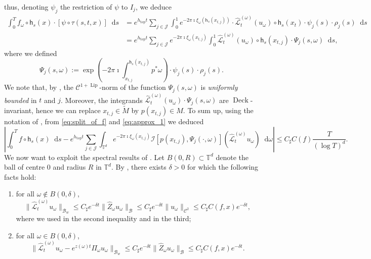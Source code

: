 \documentclass[11pt,letterpaper]{amsart}
\newcommand \cL {{\mathcal L}}
\newcommand \T {{ \mathbb T}}
\newcommand \tM {{\widetilde M}}
\newcommand \cB {{\mathscr B}}
\newcommand \sC {{C_\sharp}}
\newcommand{\horo}{\mathsf{h}}
\newcommand*{\diff}{\mathop{}\!\mathrm{d}}
\DeclareMathOperator{\topp}{top}
\DeclareMathOperator{\Deck}{Deck}
\DeclareMathOperator{\Lip}{Lip}
\theoremstyle{definition}
\begin{document}
thus, denoting $\psi_j$ the restriction of $\psi$ to $I_j$, we deduce
%
\[
\begin{split}
\int_0^T f_\omega \circ \horo_s(x) \cdot [\psi \circ \tau(s,t,x) ] \diff s &= e^{h_{\topp}t} \sum_{j \in \mathcal{J}} \int_{0}^{1} e^{- 2 \pi \imath \xi_{\omega}(\horo_s(x_{t,j}))} \cdot \hat{\cL}^{(\omega)}_{t} (u_{\omega}) \circ \horo_s(x_{t}) \cdot \psi_j(s) \cdot \rho_j(s) \diff s \\
 &= e^{h_{\topp}t} \sum_{j \in \mathcal{J}} e^{- 2 \pi \imath \xi_{\omega}(x_{t,j})}\int_{0}^{1} \hat{\cL}^{(\omega)}_{t} (u_{\omega}) \circ \horo_s(x_{t,j}) \cdot \Psi_j(s,\omega) \diff s,
\end{split}
\]
where we defined
\begin{equation}\label{eq:def_of_Psi}
\Psi_j(s, \omega) := \exp\left(- 2 \pi \imath \int_{x_{t,j}}^{\horo_s(x_{t,j})}p^{\ast}\omega \right)\cdot \psi_j(s)\cdot \rho_j(s).
\end{equation}
We note that, by , the $\mathscr{C}^{1+\Lip}$-norm of the function $\Psi_j(s, \omega)$ is \emph{uniformly bounded} in $t$ and $j$. 
Moreover, the integrands $\hat{\cL}^{(\omega)}_{t} (u_{\omega}) \cdot \Psi_j(s, \omega)$ are $\Deck$-invariant, hence we can replace $x_{t,j}\in \tM$ by $p(x_{t,j}) \in M$.
To sum up, using the notation of , from \eqref{eq:split_of_f} and \eqref{eq:approx_1} we deduced
\begin{equation}\label{eq:approx_2}
	\left\lvert \int_{0}^{T} f \circ \horo_s(x) \diff s - e^{h_{\topp}t} \sum_{j \in \mathcal{J}} \int_{\T^d} e^{- 2 \pi \imath \xi_{\omega}(x_{t,j})} \mathcal{I}[p(x_{t,j}),\Psi_j(\cdot, \omega)]\left(\hat{\cL}^{(\omega)}_{t} u_{\omega} \right) \diff \omega \right\rvert \leq \sC C(f) \frac{T}{(\log T)^d}.
\end{equation}
%
We now want to exploit the spectral results of . Let $B(0,R) \subset \T^d$ denote the ball of centre 0 and radius $R$ in $\T^d$. By , there exists $\delta >0$ for which the following facts hold:
\begin{enumerate}
\item for all $\omega \notin B(0,\delta)$, 
\[
\|\hat{\cL}^{(\omega)}_{t} u_\omega\|_{\cB_w} \leq \sC e^{-\delta t } \|\hat Z_{\omega} u_\omega\|_{\cB} \leq \sC e^{-\delta t } \|u_\omega\|_{\mathscr{C}^2}\leq \sC C(f,x) e^{-\delta t},
\]
where we used  in the second inequality and  in the third;
\item for all $\omega \in B(0,\delta)$, 
\[
\|\hat{\cL}^{(\omega)}_{t} u_\omega - e^{z(\omega) t } \Pi_{\omega} u_\omega\|_{\cB_w} \leq \sC e^{-\delta t } \|\hat Z_{\omega} u_\omega\|_{\cB} \leq \sC C(f,x) e^{-\delta t }.
\]
\end{enumerate}
\end{document}
